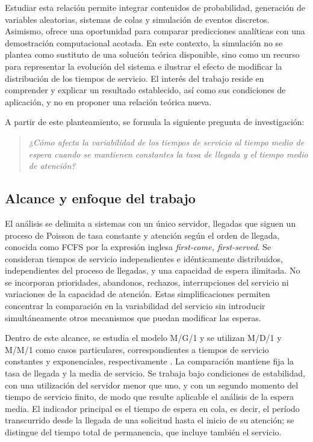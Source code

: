 Estudiar esta relación permite integrar contenidos de probabilidad, generación de variables aleatorias, sistemas de colas y simulación de eventos discretos. Asimismo, ofrece una oportunidad para comparar predicciones analíticas con una demostración computacional acotada. En este contexto, la simulación no se plantea como sustituto de una solución teórica disponible, sino como un recurso para representar la evolución del sistema e ilustrar el efecto de modificar la distribución de los tiempos de servicio. El interés del trabajo reside en comprender y explicar un resultado establecido, así como sus condiciones de aplicación, y no en proponer una relación teórica nueva.

A partir de este planteamiento, se formula la siguiente pregunta de investigación:

\begin{quote}
\emph{¿Cómo afecta la variabilidad de los tiempos de servicio al tiempo medio de espera cuando se mantienen constantes la tasa de llegada y el tiempo medio de atención?}
\end{quote}

\subsection{Alcance y enfoque del trabajo}
\label{subsec:alcance}

El análisis se delimita a sistemas con un único servidor, llegadas que siguen un proceso de Poisson de tasa constante y atención según el orden de llegada, conocida como FCFS por la expresión inglesa \emph{first-come, first-served}. Se consideran tiempos de servicio independientes e idénticamente distribuidos, independientes del proceso de llegadas, y una capacidad de espera ilimitada. No se incorporan prioridades, abandonos, rechazos, interrupciones del servicio ni variaciones de la capacidad de atención. Estas simplificaciones permiten concentrar la comparación en la variabilidad del servicio sin introducir simultáneamente otros mecanismos que puedan modificar las esperas.

Dentro de este alcance, se estudia el modelo M/G/1 y se utilizan M/D/1 y M/M/1 como casos particulares, correspondientes a tiempos de servicio constantes y exponenciales, respectivamente \cite{virtamoMG1}. La comparación mantiene fija la tasa de llegada y la media de servicio. Se trabaja bajo condiciones de estabilidad, con una utilización del servidor menor que uno, y con un segundo momento del tiempo de servicio finito, de modo que resulte aplicable el análisis de la espera media. El indicador principal es el tiempo de espera en cola, es decir, el período transcurrido desde la llegada de una solicitud hasta el inicio de su atención; se distingue del tiempo total de permanencia, que incluye también el servicio.

